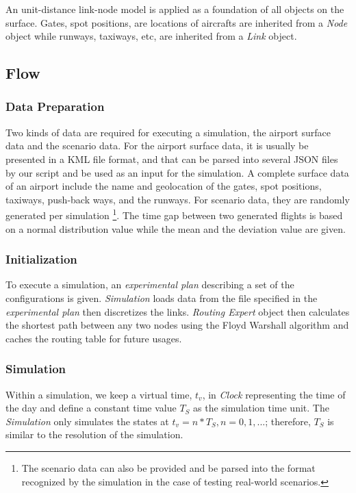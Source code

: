 \documentclass[letterpaper, 10 pt, conference]{ieeeconf}
\begin{document}
An unit-distance link-node model is applied as a foundation of all objects on the surface. Gates, spot positions, are locations of aircrafts are inherited from a {\it Node} object while runways, taxiways, etc, are inherited from a {\it Link} object.

\subsection{Flow}

\subsubsection{Data Preparation}

Two kinds of data are required for executing a simulation, the airport surface data and the scenario data. For the airport surface data, it is usually be presented in a KML file format, and that can be parsed into several JSON files by our script and be used as an input for the simulation. A complete surface data of an airport include the name and geolocation of the gates, spot positions, taxiways, push-back ways, and the runways. For scenario data, they are randomly generated per simulation \footnote{The scenario data can also be provided and be parsed into the format recognized by the simulation in the case of testing real-world scenarios.}. The time gap between two generated flights is based on a normal distribution value while the mean and the deviation value are given.

\subsubsection{Initialization}

To execute a simulation, an {\it experimental plan} describing a set of the configurations is given. {\it Simulation} loads data from the file specified in the {\it experimental plan} then discretizes the links. {\it Routing Expert} object then calculates the shortest path between any two nodes using the Floyd Warshall algorithm and caches the routing table for future usages.

\subsubsection{Simulation}

Within a simulation, we keep a virtual time, $t_v$, in {\it Clock} representing the time of the day and define a constant time value $T_S$ as the simulation time unit. The {\it Simulation} only simulates the states at $t_v = n * T_S, n = 0, 1, ...$; therefore, $T_S$ is similar to the resolution of the simulation.
\end{document}
